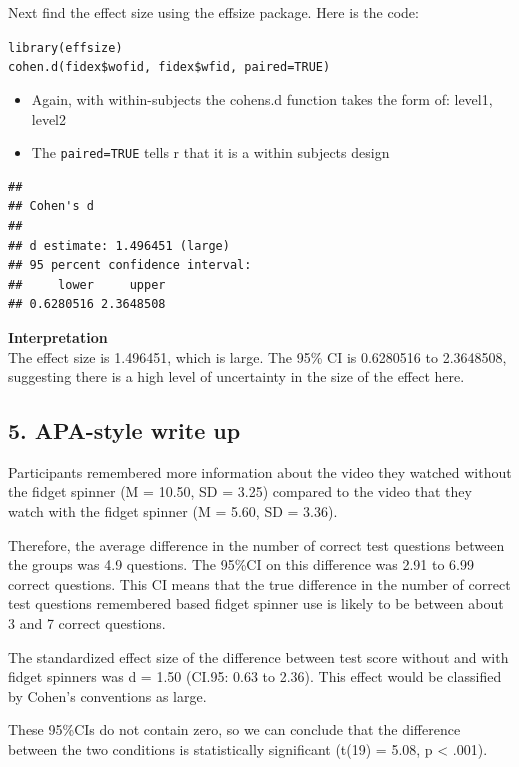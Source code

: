 \documentclass[
]{book}
\providecommand{\tightlist}{%
  \setlength{\itemsep}{0pt}\setlength{\parskip}{0pt}}
\begin{document}
Next find the effect size using the effsize package. Here is the code:

\texttt{library(effsize)}\\
\texttt{cohen.d(fidex\$wofid,\ fidex\$wfid,\ paired=TRUE)}

\begin{itemize}
\tightlist
\item
  Again, with within-subjects the cohens.d function takes the form of: level1, level2\\
\item
  The \texttt{paired=TRUE} tells r that it is a within subjects design
\end{itemize}

\begin{verbatim}
## 
## Cohen's d
## 
## d estimate: 1.496451 (large)
## 95 percent confidence interval:
##     lower     upper 
## 0.6280516 2.3648508
\end{verbatim}

\textbf{Interpretation}\\
The effect size is 1.496451, which is large. The 95\% CI is 0.6280516 to 2.3648508, suggesting there is a high level of uncertainty in the size of the effect here.

\hypertarget{apa-style-write-up}{%
\subsection{5. APA-style write up}\label{apa-style-write-up}}

Participants remembered more information about the video they watched without the fidget spinner (M = 10.50, SD = 3.25) compared to the video that they watch with the fidget spinner (M = 5.60, SD = 3.36).

Therefore, the average difference in the number of correct test questions between the groups was 4.9 questions. The 95\%CI on this difference was 2.91 to 6.99 correct questions. This CI means that the true difference in the number of correct test questions remembered based fidget spinner use is likely to be between about 3 and 7 correct questions.

The standardized effect size of the difference between test score without and with fidget spinners was d = 1.50 (CI.95: 0.63 to 2.36). This effect would be classified by Cohen's conventions as large.

These 95\%CIs do not contain zero, so we can conclude that the difference between the two conditions is statistically significant (t(19) = 5.08, p \textless{} .001).
\end{document}
